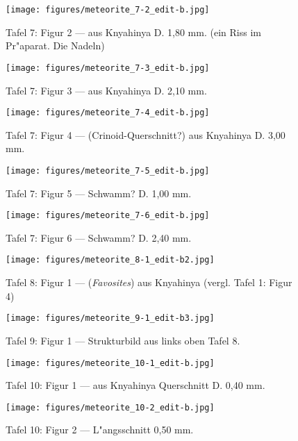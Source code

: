 \documentclass[a4paper, 11pt, oneside]{article}
\begin{document}
\clearpage
\begin{figure}[t]
\texttt{[image: figures/meteorite\_7-2\_edit-b.jpg]}
\caption{Tafel 7: Figur 2 --- aus Knyahinya D. 1,80 mm. (ein Riss im Pr"aparat. Die Nadeln)}
\centering
\end{figure}
\clearpage
\begin{figure}[t]
\texttt{[image: figures/meteorite\_7-3\_edit-b.jpg]}
\caption{Tafel 7: Figur 3 --- aus Knyahinya D. 2,10 mm.}
\centering
\end{figure}
\clearpage
\begin{figure}[t]
\texttt{[image: figures/meteorite\_7-4\_edit-b.jpg]}
\caption{Tafel 7: Figur 4 --- (Crinoid-Querschnitt?) aus Knyahinya D. 3,00 mm.}
\centering
\end{figure}
\clearpage
\begin{figure}[t]
\texttt{[image: figures/meteorite\_7-5\_edit-b.jpg]}
\caption{Tafel 7: Figur 5 --- Schwamm? D. 1,00 mm.}
\centering
\end{figure}
\clearpage
\begin{figure}[t]
\texttt{[image: figures/meteorite\_7-6\_edit-b.jpg]}
\caption{Tafel 7: Figur 6 --- Schwamm? D. 2,40 mm.}
\centering
\end{figure}
\clearpage
{}
\begin{figure}[t]
\texttt{[image: figures/meteorite\_8-1\_edit-b2.jpg]}
\caption{Tafel 8: Figur 1 --- (\emph{Favosites}) aus Knyahinya (vergl. Tafel 1: Figur 4)}
\centering
\end{figure}
\clearpage
{}
\begin{figure}[t]
\texttt{[image: figures/meteorite\_9-1\_edit-b3.jpg]}
\caption{Tafel 9: Figur 1 --- Strukturbild aus links oben Tafel 8.}
\centering
\end{figure}
\clearpage
{}
\begin{figure}[t]
\texttt{[image: figures/meteorite\_10-1\_edit-b.jpg]}
\caption{Tafel 10: Figur 1 --- aus Knyahinya Querschnitt D. 0,40 mm.}
\centering
\end{figure}
\clearpage
\begin{figure}[t]
\texttt{[image: figures/meteorite\_10-2\_edit-b.jpg]}
\caption{Tafel 10: Figur 2 --- L"angsschnitt 0,50 mm.}
\centering
\end{figure}
\end{document}

